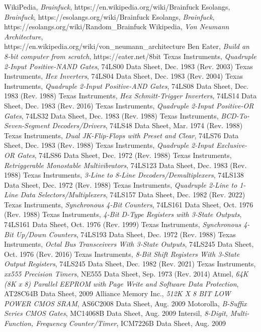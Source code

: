 \begin{thebibliography}{99} \label{resources}
 WikiPedia, \emph{Brainfuck}, https://en.wikipedia.org/wiki/Brainfuck
 Esolangs, \emph{Brainfuck}, https://esolangs.org/wiki/Brainfuck
 Esolangs, \emph{Brainfuck}, https://esolangs.org/wiki/Random\_Brainfuck
 Wikipedia, \emph{Von Neumann Architecture},\\https://en.wikipedia.org/wiki/von\_neumann\_architecture
 Ben Eater, \emph{Build an 8-bit computer from scratch}, https://eater.net/8bit
 Texas Instruments, \emph{Quadruple 2-Input Positive-NAND Gates}, 74LS00 Data Sheet, Dec. 1983 (Rev. 2003)
 Texas Instruments, \emph{Hex Inverters}, 74LS04 Data Sheet, Dec. 1983 (Rev. 2004)
 Texas Instruments, \emph{Quadruple 2-Input Positive-AND Gates}, 74LS08 Data Sheet, Dec. 1983 (Rev. 1988)
 Texas Instruments, \emph{Hex Schmitt-Trigger Inverters}, 74LS14 Data Sheet, Dec. 1983 (Rev. 2016)
 Texas Instruments, \emph{Quadruple 2-Input Positive-OR Gates}, 74LS32 Data Sheet, Dec. 1983 (Rev. 1988)
 Texas Instruments, \emph{BCD-To-Seven-Segment Decoders/Drivers}, 74LS48 Data Sheet, Mar. 1974 (Rev. 1988)
 Texas Instruments, \emph{Dual JK-Flip-Flops with Preset and Clear}, 74LS76 Data Sheet, Dec. 1983 (Rev. 1988)
 Texas Instruments, \emph{Quadruple 2-Input Exclusive-OR Gates}, 74LS86 Data Sheet, Dec. 1972 (Rev. 1988)
 Texas Instruments, \emph{Retriggerable Monostable Multivibrators}, 74LS123 Data Sheet, Dec. 1983 (Rev. 1988)
 Texas Instruments, \emph{3-Line to 8-Line Decoders/Demultiplexers}, 74LS138 Data Sheet, Dec. 1972 (Rev. 1988)
 Texas Instruments, \emph{Quadruple 2-Line to 1-Line Data Selectors/Multiplexers}, 74LS157 Data Sheet, Dec. 1982 (Rev. 2022)
 Texas Instruments, \emph{Synchronous 4-Bit Counters}, 74LS161 Data Sheet, Oct. 1976 (Rev. 1988)
 Texas Instruments, \emph{4-Bit D-Type Registers with 3-State Outputs}, 74LS161 Data Sheet, Oct. 1976 (Rev. 1999)
 Texas Instruments, \emph{Synchronous 4-Bit Up/Down Counters}, 74LS193 Data Sheet, Dec. 1972 (Rev. 1988)
 Texas Instruments, \emph{Octal Bus Transceivers With 3-State Outputs}, 74LS245 Data Sheet, Oct. 1976 (Rev. 2016)
 Texas Instruments, \emph{8-Bit Shift Registers With 3-State Output Registers}, 74LS245 Data Sheet, Dec. 1982 (Rev. 2021)
 Texas Instruments, \emph{xx555 Precision Timers}, NE555 Data Sheet, Sep. 1973 (Rev. 2014)
 Atmel, \emph{64K (8K x 8) Parallel EEPROM with Page Write and Software Data Protection}, AT28C64B Data Sheet, 2009
 Alliance Memory Inc., \emph{512K X 8 BIT LOW POWER CMOS SRAM}, AS6C2008 Data Sheet, Aug. 2009
 Motorolla, \emph{B-Suffix Series CMOS Gates}, MC14068B Data Sheet, Aug. 2009
 Intersil, \emph{8-Digit, Multi-Function, Frequency Counter/Timer}, ICM7226B Data Sheet, Aug. 2009
\end{thebibliography}

